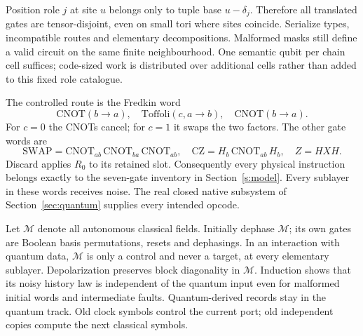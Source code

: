 Position role \(j\) at site \(u\) belongs only to tuple base
\(u-\delta_j\). Therefore all translated gates are tensor-disjoint,
even on small tori where sites coincide. Serialize types, incompatible
routes and elementary decompositions. Malformed masks still define a
valid circuit on the same finite neighbourhood. One semantic qubit per
chain cell suffices; code-sized work is distributed over additional
cells rather than added to this fixed role catalogue.

The controlled route is the Fredkin word
\[
\mathrm{CNOT}(b\to a),\quad
\mathrm{Toffoli}(c,a\to b),\quad
\mathrm{CNOT}(b\to a).
\]
For \(c=0\) the CNOTs cancel; for \(c=1\) it swaps the two factors.
The other gate words are
\[
 \mathrm{SWAP}=\mathrm{CNOT}_{ab}\,\mathrm{CNOT}_{ba}\,\mathrm{CNOT}_{ab},
 \quad \mathrm{CZ}=H_b\,\mathrm{CNOT}_{ab}\,H_b,\quad Z=HXH.
\]
Discard applies \(R_0\) to its retained slot.
Consequently every physical instruction belongs exactly to the seven-gate inventory in Section~\ref{s:model}. Every sublayer in these words
receives noise. The real closed native subsystem of
Section~\ref{sec:quantum} supplies every intended opcode.

Let \(\mathcal M\) denote all autonomous classical fields. Initially dephase
\(\mathcal M\); its own gates are Boolean basis permutations, resets and
dephasings. In an interaction with quantum data, \(\mathcal M\) is only a
control and never a target, at every elementary sublayer. Depolarization
preserves block diagonality in \(\mathcal M\). Induction shows that its noisy
history law is independent of the quantum input even for malformed
initial words and intermediate faults. Quantum-derived records stay
in the quantum track. Old clock symbols control the current port;
old independent copies compute the next classical symbols.

